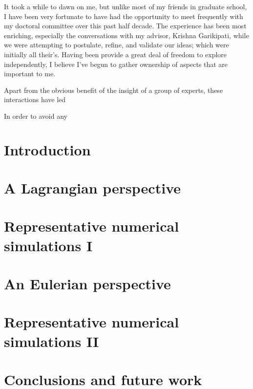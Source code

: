 \documentclass[leqno]{report}
\begin{document}

\startacknowledgementspage

{
  It took a while to dawn on me,  but unlike most of my friends in
  graduate school, I have been very fortunate to have had the
  opportunity to meet frequently with my doctoral committee over this
  past half decade. The experience has been most enriching, especially
  the conversations with my advisor, Krishna Garikipati, while we were
  attempting to postulate, refine, and validate our ideas; which were
  initially all their's. Having been provide a great deal of freedom
  to explore independently, I believe I've begun to gather ownership
  of aspects that are important to me.

  Apart from the obvious benefit of the insight of a group of experts,
  these interactions have led 

  In order to avoid any 
}

\tableofcontents
\listoffigures
\listoftables
\listofappendices

\startthechapters 

\chapter{Introduction}
\label{introduction}

\chapter{A Lagrangian perspective}
\label{lagrangian-perspective} 

\chapter{Representative numerical simulations I}
\label{numerical-simulations-1}

\chapter{An Eulerian perspective}
\label{eulerian-perspective}

\chapter{Representative numerical simulations II}
\label{numerical-simulations-2}

\chapter{Conclusions and future work}
\label{conclusions}

\end{document}
